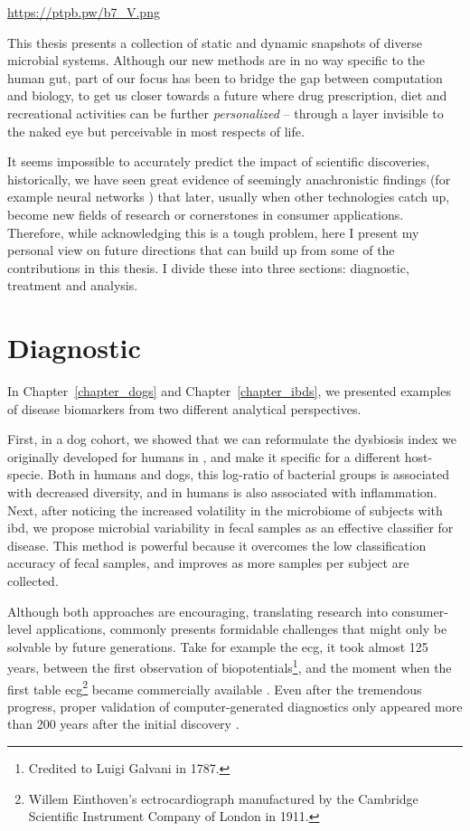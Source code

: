 \glsresetall

\url{https://ptpb.pw/b7_V.png}

This thesis presents a collection of static and dynamic snapshots of diverse
microbial systems. Although our new methods are in no way specific to the human
gut, part of our focus has been to bridge the gap between computation and
biology, to get us closer towards a future where drug prescription, diet and
recreational activities can be further \textit{personalized} -- through a layer
invisible to the naked eye but perceivable in most respects of life.

It seems impossible to accurately predict the impact of scientific discoveries,
historically, we have seen great evidence of seemingly anachronistic findings
(for example neural networks \cite{Tem10}) that later, usually
when other technologies catch up, become new fields of research or cornerstones
in consumer applications.  Therefore, while acknowledging this is a tough
problem, here I present my personal view on future directions that can build up
from some of the contributions in this thesis. I divide these into three 
sections: diagnostic, treatment and analysis.

\section{Diagnostic}

In Chapter~\ref{chapter_dogs} and Chapter~\ref{chapter_ibds}, we presented
examples of disease biomarkers from two different analytical perspectives.

First, in a dog cohort, we showed that we can reformulate the dysbiosis index 
we originally developed for humans in \cite{Gevers2014}, and make it 
specific for a different host\hyp{}specie. Both in humans and dogs, this 
log-ratio of bacterial groups is associated with decreased diversity, and in 
humans is also associated with inflammation. Next, after noticing the increased 
volatility in the microbiome of subjects with \gls{ibd}, we propose microbial 
variability in fecal samples as an effective classifier for disease. This 
method is powerful because it overcomes the low classification accuracy of 
fecal samples, and improves as more samples per subject are collected.

Although both approaches are encouraging, translating research into 
consumer\hyp{}level applications, commonly presents formidable challenges that 
might only be solvable by future generations.  Take for example the \gls{ecg}, 
it took almost 125 years, between the first observation of 
biopotentials\footnote{Credited to Luigi Galvani in 1787.}, and the moment when 
the first table \gls{ecg}\footnote{Willem Einthoven's ectrocardiograph 
manufactured by the Cambridge Scientific Instrument Company of London in 1911.} 
became commercially available \cite{ECGZywietz}. Even after the tremendous 
progress, proper validation of computer-generated diagnostics only appeared 
more than 200 years after the initial discovery \cite{njem_ecg}.

